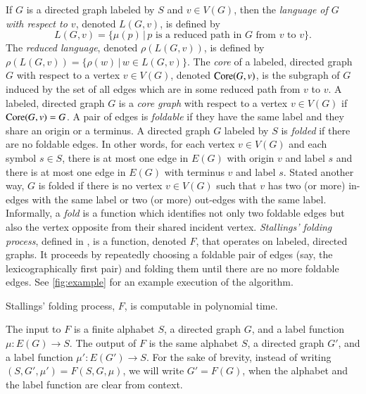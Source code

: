 \documentclass{elsarticlenonatbib}
\newcommand{\Core}{\textnormal{Core}}
\begin{document}
If $G$ is a directed graph labeled by $S$ and $v \in V(G)$, then the \emph{language of $G$ with respect to $v$}, denoted $L(G, v)$, is defined by
\begin{equation*}
  L(G, v) = \{ \mu(p) \, | \, p \text{ is a reduced path in } G \text{ from } v \text{ to } v\}.
\end{equation*}
The \emph{reduced language}, denoted $\rho(L(G, v))$, is defined by $\rho(L(G, v)) = \{ \rho(w) \, | \, w \in L(G, v) \}$.
The \emph{core} of a labeled, directed graph $G$ with respect to a vertex $v \in V(G)$, denoted $\Core(G, v)$, is the subgraph of $G$ induced by the set of all edges which are in some reduced path from $v$ to $v$.
A labeled, directed graph $G$ is a \emph{core graph} with respect to a vertex $v \in V(G)$ if $\Core(G, v) = G$.
A pair of edges is \emph{foldable} if they have the same label and they share an origin or a terminus.
A directed graph $G$ labeled by $S$ is \emph{folded} if there are no foldable edges.
In other words, for each vertex $v \in V(G)$ and each symbol $s \in S$, there is at most one edge in $E(G)$ with origin $v$ and label $s$ and there is at most one edge in $E(G)$ with terminus $v$ and label $s$.
Stated another way, $G$ is folded if there is no vertex $v \in V(G)$ such that $v$ has two (or more) in-edges with the same label or two (or more) out-edges with the same label.
Informally, a \emph{fold} is a function which identifies not only two foldable edges but also the vertex opposite from their shared incident vertex.
\emph{Stallings' folding process}, defined in \autocite[Algorithm~5.4]{stallings83}, is a function, denoted $F$, that operates on labeled, directed graphs.
It proceeds by repeatedly choosing a foldable pair of edges (say, the lexicographically first pair) and folding them until there are no more foldable edges.
See \autoref{fig:example} for an example execution of the algorithm.



\begin{theorem}\label{thm:finfp}
  Stallings' folding process, $F$, is computable in polynomial time.
\end{theorem}

The input to $F$ is a finite alphabet $S$, a directed graph $G$, and a label function $\mu \colon E(G) \to S$.
The output of $F$ is the same alphabet $S$, a directed graph $G'$, and a label function $\mu' \colon E(G') \to S$.
For the sake of brevity, instead of writing $(S, G', \mu') = F(S, G, \mu)$, we will write $G' = F(G)$, when the alphabet and the label function are clear from context.
\end{document}
